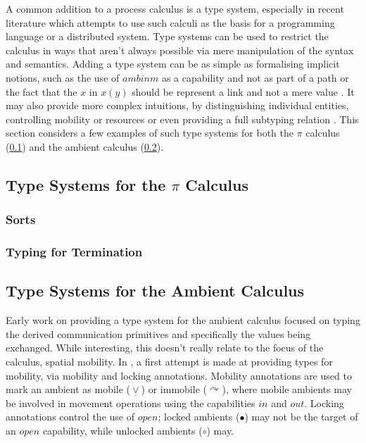 A common addition to a process calculus is a type system, especially in
recent literature which attempts to use such calculi as the basis for a
programming language or a distributed system.  Type systems can be used
to restrict the calculus in ways that aren't always possible via mere
manipulation of the syntax and semantics.  Adding a type system can be
as simple as formalising implicit notions, such as the use of $ambin{m}$
as a capability and not as part of a path \cite{ambienttypes} or the
fact that the $x$ in $x(y)$ should be represent a link and not a mere
value \cite{sangiorgi:types-or}.  It may also provide more complex
intuitions, by distinguishing individual entities, controlling mobility
\cite{sangiorgi:mobsafeambients, ambienttypes} or resources
\cite{hennessy:dpi98} or even providing a full subtyping relation
\cite{boxedamb02}.  This section considers a few examples of such type
systems for both the $\pi$ calculus (\ref{pitypes}) and the ambient
calculus (\ref{ambienttypes}).

\subsection{Type Systems for the $\pi$ Calculus}
\label{pitypes}

\subsubsection{Sorts}
\subsubsection{Typing for Termination}

\subsection{Type Systems for the Ambient Calculus}
\label{ambienttypes}

Early work \cite{commtypesamb} on providing a type system for the
ambient calculus focused on typing the derived communication primitives
and specifically the values being exchanged.  While interesting, this
doesn't really relate to the focus of the calculus, spatial mobility.
In \cite{cardelli:typesforambients, cardelli:ambienttypes}, a first
attempt is made at providing types for mobility, via mobility and locking
annotations.  Mobility annotations are used to mark an ambient as mobile
($\underline{\vee}$) or immobile ($\curvearrowright$), where mobile
ambients may be involved in movement operations using the capabilities
$in$ and $out$.  Locking annotations control the use of $open$; locked
ambients ($\bullet$) may not be the target of an $open$ capability,
while unlocked ambients ($\circ$) may.


